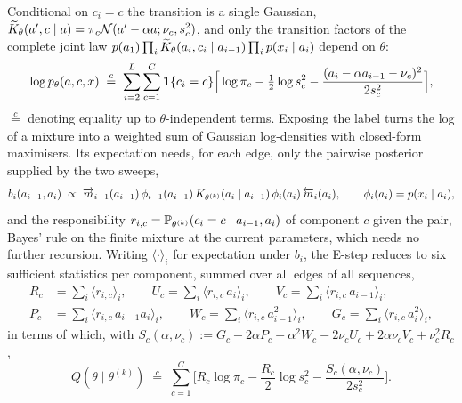 Conditional on $c_i = c$ the transition is a single Gaussian,
$\widetilde{K}_\theta(a',c\mid a) = \pi_c\mathcal{N}(a'-\alpha a;\nu_c,s_c^2)$, and
only the transition factors of the complete joint law
$p(a_1)\prod_i\widetilde{K}_\theta(a_i,c_i\mid a_{i-1})\prod_i p(x_i\mid a_i)$
depend on $\theta$:
\begin{equation}
  \log p_\theta(a,c,x)
  \;\overset{c}{=}\;
  \sum_{i=2}^{L}\sum_{c=1}^{C}\mathbf 1\{c_i=c\}
  \Big[ \log\pi_c - \tfrac12\log s_c^2
        - \frac{(a_i-\alpha a_{i-1}-\nu_c)^2}{2s_c^2} \Big],
  \label{eq:em-complete-ll}
\end{equation}
$\overset{c}{=}$ denoting equality up to $\theta$-independent terms. Exposing
the label turns the log of a mixture into a weighted sum of Gaussian
log-densities with closed-form maximisers. Its expectation needs, for each
edge, only the pairwise posterior supplied by the two sweeps,
\begin{equation}
  b_i(a_{i-1},a_i) \;\propto\;
  \overrightarrow{m}_{i-1}(a_{i-1})\,\phi_{i-1}(a_{i-1})\,
  K_{\theta^{(k)}}(a_i\mid a_{i-1})\,
  \phi_i(a_i)\,\overleftarrow{m}_i(a_i),
  \qquad \phi_i(a_i) = p(x_i \mid a_i),
  \label{eq:em-pairwise}
\end{equation}
and the responsibility $r_{i,c} = \mathbb{P}_{\theta^{(k)}}(c_i = c \mid a_{i-1}, a_i)$
of component $c$ given the pair, Bayes' rule on the finite mixture at the
current parameters, which needs no further recursion. Writing
$\langle\cdot\rangle_i$ for expectation under $b_i$, the E-step reduces to six
sufficient statistics per component, summed over all edges of all sequences,
\begin{equation}
  \begin{aligned}
    R_c &= \textstyle\sum_i \langle r_{i,c}\rangle_i, \qquad
    U_c = \textstyle\sum_i \langle r_{i,c}\,a_i\rangle_i, \qquad
    V_c = \textstyle\sum_i \langle r_{i,c}\,a_{i-1}\rangle_i, \\
    P_c &= \textstyle\sum_i \langle r_{i,c}\,a_{i-1}a_i\rangle_i, \qquad
    W_c = \textstyle\sum_i \langle r_{i,c}\,a_{i-1}^2\rangle_i, \qquad
    G_c = \textstyle\sum_i \langle r_{i,c}\,a_i^2\rangle_i,
  \end{aligned}
  \label{eq:em-suffstats}
\end{equation}
in terms of which, with
$S_c(\alpha,\nu_c) := G_c - 2\alpha P_c + \alpha^2 W_c - 2\nu_c U_c + 2\alpha\nu_c V_c + \nu_c^2 R_c$,
\begin{equation}
  Q(\theta\mid\theta^{(k)})
  \;\overset{c}{=}\;
  \sum_{c=1}^{C}
  \Big[ R_c\log\pi_c - \frac{R_c}{2}\log s_c^2 - \frac{S_c(\alpha,\nu_c)}{2s_c^2} \Big].
  \label{eq:em-Q-suffstats}
\end{equation}


